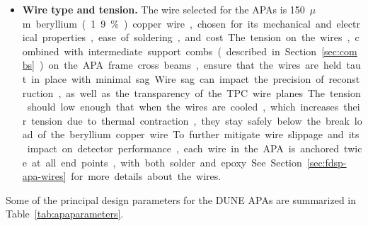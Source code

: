 \begin{itemize}
\item \textbf{Wire type and tension.}  The wire selected for the APAs is \SI{150}{$\mu$m} beryllium (1.9\%) copper wire, %
chosen for its mechanical and electrical properties, ease of soldering, and cost.  The tension on the wires, combined with intermediate support combs (described in Section~\ref{sec:combs}) on the APA frame cross beams, ensure that the wires are held taut in place with minimal sag.  Wire sag can impact the precision of reconstruction, as well as the transparency of the TPC wire planes.  The tension should low enough that when the wires are cooled, which increases their tension due to thermal contraction, they stay safely below the break load of the beryllium copper wire.  To further mitigate wire slippage and its impact on detector performance, each wire in the APA is anchored twice at all end points, with both solder and epoxy.  See Section~\ref{sec:fdsp-apa-wires} for more details about the wires.

\end{itemize}

Some of the principal design parameters for the DUNE APAs are summarized in Table~\ref{tab:apaparameters}.

